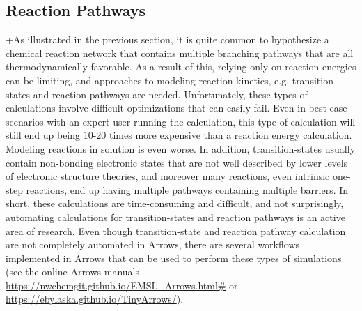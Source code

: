 \documentclass[runningheads,a4paper]{llncs}
\begin{document}
\subsection{Reaction Pathways}
\label{subsection:app.reactionpathways}
+As illustrated in the previous section, it is quite common to hypothesize a chemical reaction network that contains multiple branching pathways that are all thermodynamically favorable.  As a result of this, relying only on reaction energies can be limiting, and approaches to modeling reaction kinetics, e.g. transition-states and reaction pathways are needed.  Unfortunately, these types of calculations involve difficult optimizations that can easily fail.  Even in best case scenarios with an expert user running the calculation, this type of calculation will still end up being 10-20 times more expensive than a reaction energy calculation.  Modeling reactions in solution is even worse.  In addition, transition-states usually contain non-bonding electronic states that are not well described by lower levels of electronic structure theories, and moreover many reactions, even intrinsic one-step reactions, end up having multiple pathways containing multiple barriers.  In short, these calculations are time-consuming and difficult, and not surprisingly, automating calculations for transition-states and reaction pathways is an active area of research.  Even though transition-state and reaction pathway calculation are not completely automated in Arrows, there are several workflows implemented in Arrows that can be used to perform these types of simulations (see the online Arrows manuals \url{https://nwchemgit.github.io/EMSL_Arrows.html#} or 
 \url{https://ebylaska.github.io/TinyArrows/}). 
\end{document}
